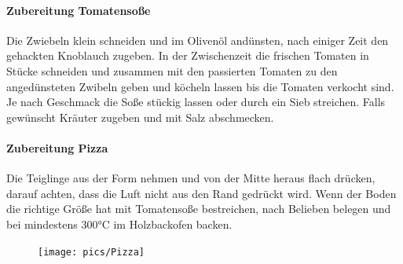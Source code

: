 \paragraph{Zubereitung Tomatensoße}
Die Zwiebeln klein schneiden und im Olivenöl andünsten, nach einiger Zeit den 
gehackten Knoblauch zugeben. In der Zwischenzeit die frischen Tomaten in 
Stücke schneiden und zusammen mit den passierten Tomaten zu den 
angedünsteten Zwibeln geben und köcheln lassen bis die Tomaten verkocht 
sind. Je nach Geschmack die Soße stückig lassen oder durch ein Sieb streichen.
Falls gewünscht Kräuter zugeben und mit Salz abschmecken.

\paragraph{Zubereitung Pizza}
Die Teiglinge aus der Form nehmen und von der Mitte heraus flach drücken, 
darauf achten, dass die Luft nicht aus den Rand gedrückt wird. Wenn der Boden 
die richtige Größe hat mit Tomatensoße bestreichen, nach Belieben belegen 
und bei mindestens 300°C im Holzbackofen backen.
\newpage

\begin{figure}[htbp]
	\centering
	\begin{minipage}{1\textwidth}
		\centering
		\texttt{[image: pics/Pizza]}
		\label{fig:Pizza}
	\end{minipage}
\end{figure}
\newpage
